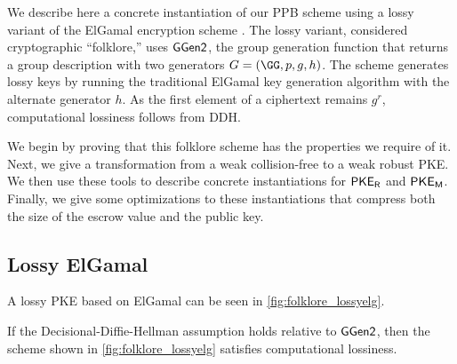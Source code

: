 We describe here a concrete instantiation of our PPB scheme using a lossy variant of the ElGamal encryption scheme \cite{C:ElGamal84}.
% 
The lossy variant, considered cryptographic ``folklore,'' uses $\mathsf{GGen2}$, the group generation function that returns a group description with two generators $G = (\group, \egprime, \ggen, \hgen)$.
The scheme generates lossy keys by running the traditional ElGamal key generation algorithm with the alternate generator $h$.
As the first element of a ciphertext remains $g^r$, computational lossiness follows from DDH.

We begin by proving that this folklore scheme has the properties we require of it.
Next, we give a transformation from a weak collision-free to a weak robust PKE.
We then use these tools to describe concrete instantiations for ${{\mathsf{PKE}_{{\mathsf{R}}}}}$ and ${{\mathsf{PKE}_{{\mathsf{M}}}}}$.
Finally, we give some optimizations to these instantiations that compress both the size of the escrow value and the public key.

\subsection{Lossy ElGamal}

A lossy PKE based on ElGamal can be seen in \cref{fig:folklore_lossyelg}.


\begin{theorem}
	If the Decisional-Diffie-Hellman assumption holds relative to $\mathsf{GGen2}$, then the scheme shown in \cref{fig:folklore_lossyelg} satisfies computational lossiness.
\end{theorem}


